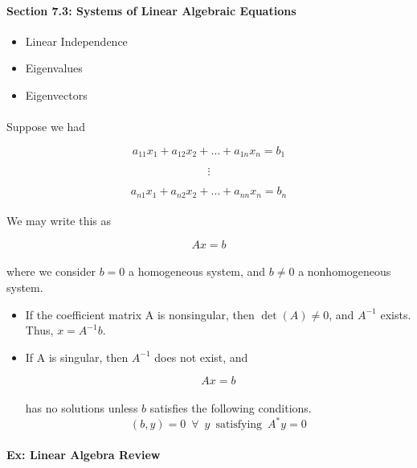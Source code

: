 \documentclass{article}
\begin{document}
\paragraph{Section 7.3: Systems of Linear Algebraic Equations}
\begin{itemize}
    \item Linear Independence
    \item Eigenvalues
    \item Eigenvectors
\end{itemize}
\paragraph{}Suppose we had

\[
    a_{11}x_1 + a_{12}x_2 + \ldots + a_{1n}x_n = b_1
\]

\[
\vdots
\]


\[
    a_{n1}x_1 + a_{n2}x_2 + \ldots + a_{nn}x_n = b_n
\]

\paragraph{}We may write this as

\[
Ax = b
\]
\paragraph{}where we consider $b = 0$ a homogeneous system, and $b \ne 0$ a nonhomogeneous system.

\begin{itemize}
    \item If the coefficient matrix A is nonsingular, then $\det(A) \ne 0$, and $A^{-1}$ exists. Thus, $x = A^{-1}b$.
    \item If A is singular, then $A^{-1}$ does not exist, and
        
        \[
        Ax = b
        \]
    \paragraph{}has no solutions unless $b$ satisfies the following conditions.
    \[
        (b,y) = 0 \,\,\, \forall \,\,\, y \,\,\, \text{satisfying}\,\,\,  A^{*}y = 0 
    \]
\end{itemize}
\paragraph{Ex: Linear Algebra Review}

\makeatletter
\renewcommand*\env@matrix[1][*\c@MaxMatrixCols c]{%
\hskip -\arraycolsep
\let\@ifnextchar\new@ifnextchar
\array{#1}}
\makeatother
\end{document}
